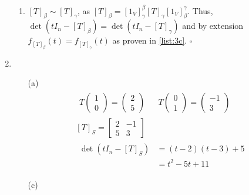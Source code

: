 \documentclass[12pt]{article}
\begin{document}
\begin{enumerate}
\begin{enumerate}
                  \item $[T]_\beta\sim[T]_\gamma$, as $[T]_\beta=[\mathrm{1}_V]^\beta_\gamma[T]_\gamma[\mathrm{1}_V]^\gamma_\beta$.
                        Thus, $\det (tI_n - [T]_\beta)=\det (tI_n - [T]_\gamma)$ and by extension
                        $f_{[T]_\beta}(t)=f_{[T]_\gamma}(t)$ as proven in \ref{list:3c}. $\square$
            \end{enumerate}
      \item \begin{enumerate}
                  \item[(a)] \begin{gather*}
                              \begin{aligned}
                                    T\begin{pmatrix}1 \\ 0\end{pmatrix}=\begin{pmatrix}2 \\ 5\end{pmatrix} &  &
                                    T\begin{pmatrix}0 \\ 1\end{pmatrix}=\begin{pmatrix}-1 \\ 3\end{pmatrix}
                              \end{aligned} \\
                              [T]_S=\begin{bmatrix}
                                    2 & -1 \\
                                    5 & 3
                              \end{bmatrix} \\
                              \begin{aligned}
                                    \det \left(tI_n-[T]_S\right) & =(t-2)(t-3)+5       \\
                                                                 & = \boxed{t^2-5t+11}
                              \end{aligned}
                        \end{gather*}
                  \item[(c)] \begin{gather*}
                              \begin{aligned}

\end{aligned}
\end{gather*}
\end{enumerate}
\end{enumerate}
\end{document}

